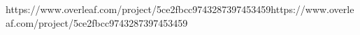 https://www.overleaf.com/project/5ce2fbcc9743287397453459https://www.overleaf.com/project/5ce2fbcc9743287397453459